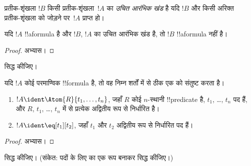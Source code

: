 \documentclass[../../../include/open-logic-section]{subfiles}
\begin{document}
\begin{defn}[उचित आरंभिक खंड]
प्रतीक-शृंखला $!B$ किसी प्रतीक-शृंखला~$!A$ का \emph{उचित आरंभिक खंड} है यदि
$!B$ और किसी अरिक्त प्रतीक-शृंखला को जोड़ने पर~$!A$ प्राप्त हो।
\end{defn}

\begin{lem}
यदि $!A$ !!a{formula} है और $!B$, $!A$ का उचित आरंभिक खंड है, तो $!B$
!!a{formula} नहीं है।
\end{lem}

\begin{proof}
अभ्यास।
\end{proof}

\begin{prob}
 सिद्ध कीजिए।
\end{prob}

\begin{prop}
यदि $!A$ कोई परमाण्विक !!{formula} है, तो वह निम्न शर्तों में से ठीक एक को
संतुष्ट करता है।
\begin{enumerate}
\item $!A \ident \Atom{R}{t_1,\dots,t_n}$, जहाँ $R$ कोई $n$-स्थानी
  !!{predicate} है, $t_1$, \dots, $t_n$ पद हैं, और $R$, $t_1$, \dots,
  $t_n$ में से प्रत्येक अद्वितीय रूप से निर्धारित है।
\item $!A \ident \eq[t_1][t_2]$, जहाँ $t_1$ और $t_2$ अद्वितीय रूप से
  निर्धारित पद हैं।
\end{enumerate}
\end{prop}

\begin{proof}
अभ्यास।
\end{proof}

\begin{prob}
 सिद्ध कीजिए। (संकेत: पदों के लिए
 का एक रूप बनाकर सिद्ध कीजिए।)
\end{prob}
\end{document}
